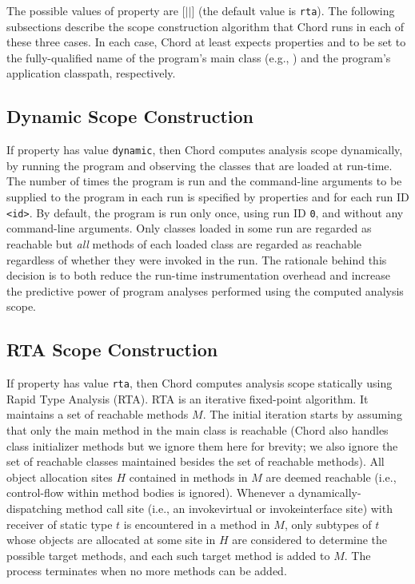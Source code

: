 The possible values of property  are
[$|$$|$] (the default value is {\tt rta}).
The following subsections describe the scope construction algorithm
that Chord runs in each of these three cases.
In each case, Chord at
least expects properties  and
 to be set to the fully-qualified name of the
program's main class (e.g., ) and the
program's application classpath, respectively.

\subsection{Dynamic Scope Construction}

If property  has value {\tt dynamic}, then Chord
computes analysis scope
dynamically, by running the program and observing the
classes that are loaded at run-time.  The number of times the program
is run and the command-line arguments to be supplied to the program in
each run is specified by properties  and
 for each run ID {\tt <id>}.  By default, the
program is run only once, using run ID {\tt 0}, and without any
command-line arguments.  Only classes loaded in some run are regarded
as reachable but {\it all} methods of each loaded class are regarded
as reachable regardless of whether they were invoked in the run.  The
rationale behind this decision is to both reduce the run-time instrumentation
overhead and increase the predictive power of program analyses
performed using the computed analysis scope.

\subsection{RTA Scope Construction}

If property  has value {\tt rta}, then Chord
computes analysis scope statically using Rapid Type Analysis (RTA).
RTA is an iterative fixed-point algorithm.  It maintains a set of
reachable methods $M$.  The initial iteration starts by assuming that
only the main method in the main class is reachable (Chord also
handles class initializer methods but we ignore them here for brevity;
we also ignore the set of reachable classes maintained besides the set
of reachable methods).  All object allocation sites $H$ contained in
methods in $M$ are deemed reachable (i.e., control-flow within method
bodies is ignored).  Whenever a dynamically-dispatching method call
site (i.e., an invokevirtual or invokeinterface site) with receiver of
static type $t$ is encountered in a method in $M$, only subtypes of
$t$ whose objects are allocated at some site in $H$ are considered to
determine the possible target methods, and each such target method is
added to $M$.  The process terminates when no more methods can be
added.


